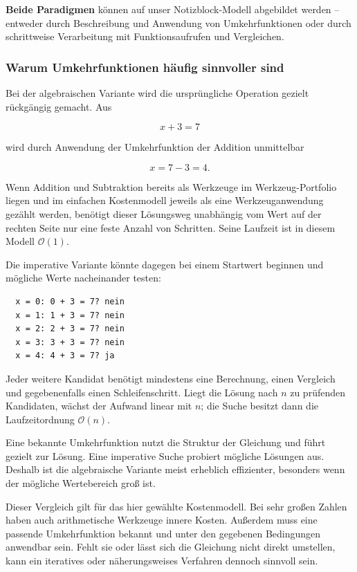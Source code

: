 \documentclass{article}
\begin{document}
\textbf{Beide Paradigmen} können auf unser Notizblock-Modell abgebildet werden – entweder durch Beschreibung und Anwendung von Umkehrfunktionen oder durch schrittweise Verarbeitung mit Funktionsaufrufen und Vergleichen.

\subsubsection{Warum Umkehrfunktionen häufig sinnvoller sind}

Bei der algebraischen Variante wird die ursprüngliche Operation gezielt rückgängig gemacht. Aus

\[
x+3=7
\]

wird durch Anwendung der Umkehrfunktion der Addition unmittelbar

\[
x=7-3=4.
\]

Wenn Addition und Subtraktion bereits als Werkzeuge im Werkzeug-Portfolio liegen und im einfachen Kostenmodell jeweils als eine Werkzeuganwendung gezählt werden, benötigt dieser Lösungsweg unabhängig vom Wert auf der rechten Seite nur eine feste Anzahl von Schritten. Seine Laufzeit ist in diesem Modell \(\mathcal{O}(1)\).

Die imperative Variante könnte dagegen bei einem Startwert beginnen und mögliche Werte nacheinander testen:

\begin{verbatim}
  x = 0: 0 + 3 = 7? nein
  x = 1: 1 + 3 = 7? nein
  x = 2: 2 + 3 = 7? nein
  x = 3: 3 + 3 = 7? nein
  x = 4: 4 + 3 = 7? ja
\end{verbatim}

Jeder weitere Kandidat benötigt mindestens eine Berechnung, einen Vergleich und gegebenenfalls einen Schleifenschritt. Liegt die Lösung nach \(n\) zu prüfenden Kandidaten, wächst der Aufwand linear mit \(n\); die Suche besitzt dann die Laufzeitordnung \(\mathcal{O}(n)\).

\begin{merksatz}
Eine bekannte Umkehrfunktion nutzt die Struktur der Gleichung und führt gezielt zur Lösung. Eine imperative Suche probiert mögliche Lösungen aus. Deshalb ist die algebraische Variante meist erheblich effizienter, besonders wenn der mögliche Wertebereich groß ist.
\end{merksatz}

Dieser Vergleich gilt für das hier gewählte Kostenmodell. Bei sehr großen Zahlen haben auch arithmetische Werkzeuge innere Kosten. Außerdem muss eine passende Umkehrfunktion bekannt und unter den gegebenen Bedingungen anwendbar sein. Fehlt sie oder lässt sich die Gleichung nicht direkt umstellen, kann ein iteratives oder näherungsweises Verfahren dennoch sinnvoll sein.
\end{document}
